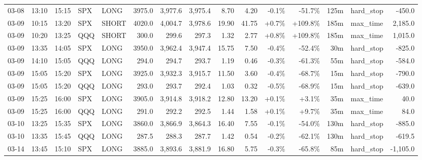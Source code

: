 \documentclass[11pt,a4paper,twoside]{article}
\begin{document}
\begin{landscape}
\begin{center}
\begin{longtable}{>{\color{txtmain}}l l l l l r r r r r r r r >{\color{txtmain}}l r}
03-08 & 13:10 & 15:15 & SPX & LONG & 3975.0 & 3,977.6 & 3,975.4 & 8.70 & 4.20 & \textcolor{lossred}{-0.1\%} & \textcolor{lossred}{-51.7\%} & 125m & hard\_stop & \textcolor{lossred}{-450.0} \\
03-09 & 10:15 & 13:20 & SPX & SHORT & 4020.0 & 4,004.7 & 3,978.6 & 19.90 & 41.75 & \textcolor{wingreen}{+0.7\%} & \textcolor{wingreen}{+109.8\%} & 185m & max\_time & \textcolor{wingreen}{2,185.0} \\
03-09 & 10:20 & 13:25 & QQQ & SHORT & 300.0 & 299.6 & 297.3 & 1.32 & 2.77 & \textcolor{wingreen}{+0.8\%} & \textcolor{wingreen}{+109.8\%} & 185m & max\_time & \textcolor{wingreen}{1,015.0} \\
03-09 & 13:35 & 14:05 & SPX & LONG & 3950.0 & 3,962.4 & 3,947.4 & 15.75 & 7.50 & \textcolor{lossred}{-0.4\%} & \textcolor{lossred}{-52.4\%} & 30m & hard\_stop & \textcolor{lossred}{-825.0} \\
03-09 & 14:10 & 15:05 & QQQ & LONG & 294.0 & 294.7 & 293.7 & 1.19 & 0.46 & \textcolor{lossred}{-0.3\%} & \textcolor{lossred}{-61.3\%} & 55m & hard\_stop & \textcolor{lossred}{-584.0} \\
03-09 & 15:05 & 15:20 & SPX & LONG & 3925.0 & 3,932.3 & 3,915.7 & 11.50 & 3.60 & \textcolor{lossred}{-0.4\%} & \textcolor{lossred}{-68.7\%} & 15m & hard\_stop & \textcolor{lossred}{-790.0} \\
03-09 & 15:05 & 15:20 & QQQ & LONG & 293.0 & 293.7 & 292.4 & 1.03 & 0.32 & \textcolor{lossred}{-0.5\%} & \textcolor{lossred}{-68.9\%} & 15m & hard\_stop & \textcolor{lossred}{-639.0} \\
03-09 & 15:25 & 16:00 & SPX & LONG & 3905.0 & 3,914.8 & 3,918.2 & 12.80 & 13.20 & \textcolor{wingreen}{+0.1\%} & \textcolor{wingreen}{+3.1\%} & 35m & max\_time & \textcolor{wingreen}{40.0} \\
03-09 & 15:25 & 16:00 & QQQ & LONG & 291.0 & 292.2 & 292.5 & 1.44 & 1.58 & \textcolor{wingreen}{+0.1\%} & \textcolor{wingreen}{+9.7\%} & 35m & max\_time & \textcolor{wingreen}{84.0} \\
03-10 & 13:25 & 15:35 & SPX & LONG & 3860.0 & 3,866.9 & 3,864.3 & 16.40 & 7.55 & \textcolor{lossred}{-0.1\%} & \textcolor{lossred}{-54.0\%} & 130m & hard\_stop & \textcolor{lossred}{-885.0} \\
03-10 & 13:35 & 15:45 & QQQ & LONG & 287.5 & 288.3 & 287.7 & 1.42 & 0.54 & \textcolor{lossred}{-0.2\%} & \textcolor{lossred}{-62.1\%} & 130m & hard\_stop & \textcolor{lossred}{-619.5} \\
03-14 & 13:45 & 15:10 & SPX & LONG & 3885.0 & 3,893.6 & 3,881.9 & 16.80 & 5.75 & \textcolor{lossred}{-0.3\%} & \textcolor{lossred}{-65.8\%} & 85m & hard\_stop & \textcolor{lossred}{-1,105.0} \\

\end{longtable}
\end{center}
\end{landscape}
\end{document}
